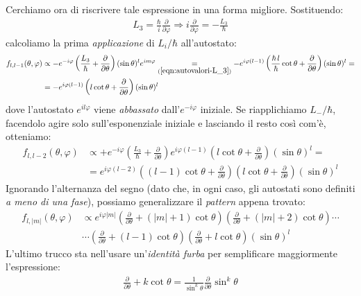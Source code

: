 \documentclass[../../FisicaTeorica.tex]{subfiles}
\begin{document}
Cerchiamo ora di riscrivere tale espressione in una forma migliore. Sostituendo:
\begin{align*}
L_3 = \frac{\hbar}{i}\frac{\partial}{\partial \varphi} \Rightarrow  i\frac{\partial}{\partial \varphi} = -\frac{L_3}{\hbar}
\end{align*} 
calcoliamo la prima \textit{applicazione} di $L_i/\hbar$ all'autostato:
\begin{align*}
f_{l,l-1}(\theta,\varphi) &\propto
-e^{-i\varphi}\left(\frac{L_3}{\hbar} + \frac{\partial}{\partial \theta}\right) (\sin\theta)^l e^{im\varphi} \underset{(\ref{eqn:autovalori-L_3})}{=} -e^{i\varphi(l-1)}\left(\frac{\hbar\, l}{\hbar}\cot\theta + \frac{\partial}{\partial \theta}\right)(\sin\theta)^l=\\
&=-e^{i\varphi(l-1)}\left(l\cot\theta +\frac{\partial}{\partial \theta}\right)(\sin\theta)^l
\end{align*}
dove l'autostato $e^{il\varphi}$ viene \textit{abbassato} dall'$e^{-i\varphi}$ iniziale. Se riapplichiamo $L_-/\hbar$, facendolo agire solo sull'esponenziale iniziale e lasciando il resto così com'è, otteniamo: %
\begin{align*}
f_{l,l-2}(\theta,\varphi)&\propto +e^{-i\varphi}\left(\frac{L_3}{\hbar} + \frac{\partial}{\partial \theta}\right)e^{i\varphi(l-1)}\left( l\cot \theta +\frac{\partial}{\partial \theta}\right)(\sin\theta)^l =\\
&=e^{i\varphi(l-2)}\left((l-1)\cot\theta + \frac{\partial}{\partial \theta}\right)\left(l\cot\theta + \frac{\partial}{\partial \theta}\right)(\sin\theta)^l
\end{align*}
Ignorando l'alternanza del segno (dato che, in ogni caso, gli autostati sono definiti \textit{a meno di una fase}), possiamo generalizzare il \textit{pattern} appena trovato:
\begin{align}
\label{eqn:autostato_partial1}
f_{l,|m|}(\theta,\varphi)&\propto e^{i\varphi|m|}\left( \frac{\partial}{\partial \theta} + (|m|+1)\cot\theta
\right)\left(\frac{\partial}{\partial \theta}+(|m|+2)\cot\theta\right)\cdots\\
&\cdots \left(\frac{\partial}{\partial \theta}+(l-1)\cot\theta \right)\left(\frac{\partial}{\partial \theta}+l\cot\theta\right)(\sin\theta)^l
\nonumber
\end{align}
L'ultimo trucco sta nell'usare un'\textit{identità furba} per semplificare maggiormente l'espressione:
\begin{align*}
\frac{\partial}{\partial\theta} + k\cot\theta = \frac{1}{\sin^k\theta}\frac{\partial }{\partial\theta}\sin^k\theta
\end{align*}
\end{document}
